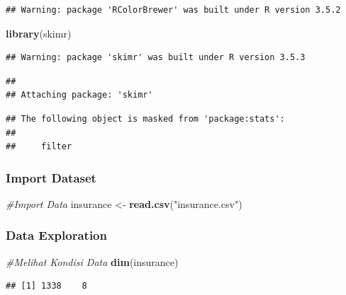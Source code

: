 \documentclass[]{article}
\newenvironment{Shaded}{\begin{snugshade}}{\end{snugshade}}
\newcommand{\CommentTok}[1]{\textcolor[rgb]{0.56,0.35,0.01}{\textit{#1}}}
\newcommand{\KeywordTok}[1]{\textcolor[rgb]{0.13,0.29,0.53}{\textbf{#1}}}
\newcommand{\NormalTok}[1]{#1}
\newcommand{\StringTok}[1]{\textcolor[rgb]{0.31,0.60,0.02}{#1}}
\begin{document}
\begin{verbatim}
## Warning: package 'RColorBrewer' was built under R version 3.5.2
\end{verbatim}

\begin{Shaded}
\begin{Highlighting}[]
\KeywordTok{library}\NormalTok{(skimr)}
\end{Highlighting}
\end{Shaded}

\begin{verbatim}
## Warning: package 'skimr' was built under R version 3.5.3
\end{verbatim}

\begin{verbatim}
## 
## Attaching package: 'skimr'
\end{verbatim}

\begin{verbatim}
## The following object is masked from 'package:stats':
## 
##     filter
\end{verbatim}

\hypertarget{import-dataset}{%
\subsubsection{Import Dataset}\label{import-dataset}}

\begin{Shaded}
\begin{Highlighting}[]
\CommentTok{#Import Data}
\NormalTok{insurance <-}\StringTok{ }\KeywordTok{read.csv}\NormalTok{(}\StringTok{"insurance.csv"}\NormalTok{)}
\end{Highlighting}
\end{Shaded}

\hypertarget{data-exploration}{%
\subsubsection{Data Exploration}\label{data-exploration}}

\begin{Shaded}
\begin{Highlighting}[]
\CommentTok{#Melihat Kondisi Data}
\KeywordTok{dim}\NormalTok{(insurance)}
\end{Highlighting}
\end{Shaded}

\begin{verbatim}
## [1] 1338    8
\end{verbatim}
\end{document}
